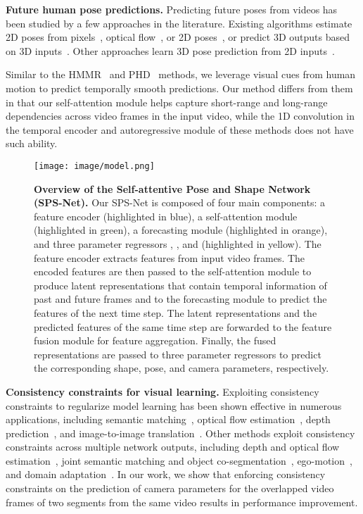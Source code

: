 \documentclass[times,referee,twocolumn,final,authoryear]{elsarticle}
\newcommand{\heading}[1]{\noindent\textbf{#1}}
\begin{document}
\heading{Future human pose predictions.}
Predicting future poses from videos has been studied by a few approaches in the literature.
Existing algorithms estimate 2D poses from pixels~\citep{denton2017unsupervised,finn2016unsupervised}, optical flow~\citep{walker2016uncertain}, or 2D poses~\citep{walker2017pose}, or predict 3D outputs based on 3D inputs~\citep{butepage2017deep,fragkiadaki2015recurrent,jain2016structural,li2017auto,villegas2018neural}.
Other approaches learn 3D pose prediction from 2D inputs~\citep{PHD,TemporalHMR}.

Similar to the HMMR~\citep{TemporalHMR} and PHD~\citep{PHD} methods, we leverage visual cues from human motion to predict temporally smooth predictions.
Our method differs from them in that our self-attention module helps capture short-range and long-range dependencies across video frames in the input video, while the 1D convolution in the temporal encoder and autoregressive module of these methods does not have such ability.

\begin{figure*}[t]
  \begin{center}
    \texttt{[image: image/model.png]}
  \end{center}
  \vspace{-6.0mm}
  \caption{
\textbf{Overview of the Self-attentive Pose and Shape Network (SPS-Net).} 
Our SPS-Net is composed of four main components: a feature encoder  (highlighted in blue), a self-attention module  (highlighted in green), a forecasting module  (highlighted in orange), and three parameter regressors , , and  (highlighted in yellow).
The feature encoder extracts features from input video frames.
The encoded features are then passed to the self-attention module to produce latent representations that contain temporal information of past and future frames and to the forecasting module to predict the features of the next time step.
The latent representations and the predicted features of the same time step are forwarded to the feature fusion module for feature aggregation.
Finally, the fused representations are passed to three parameter regressors to predict the corresponding shape, pose, and camera parameters, respectively.
  }
  \label{fig:model}
  \vspace{-5.0mm}
\end{figure*}

\heading{Consistency constraints for visual learning.} 
Exploiting consistency constraints to regularize model learning has been shown effective in numerous applications, including semantic matching~\citep{FlowWeb}, optical flow estimation~\citep{UnFlow}, depth prediction~\citep{gordon2019depth}, and image-to-image translation~\citep{zhu2017unpaired,DRIT,MUNIT}.
Other methods exploit consistency constraints across multiple network outputs, including depth and optical flow estimation~\citep{zou2018df}, joint semantic matching and object co-segmentation~\citep{chen2020show}, ego-motion~\citep{zhou2017unsupervised}, and domain adaptation~\citep{CrDoCo}.
In our work, we show that enforcing consistency constraints on the prediction of camera parameters for the overlapped video frames of two segments from the same video results in performance improvement.
\end{document}
